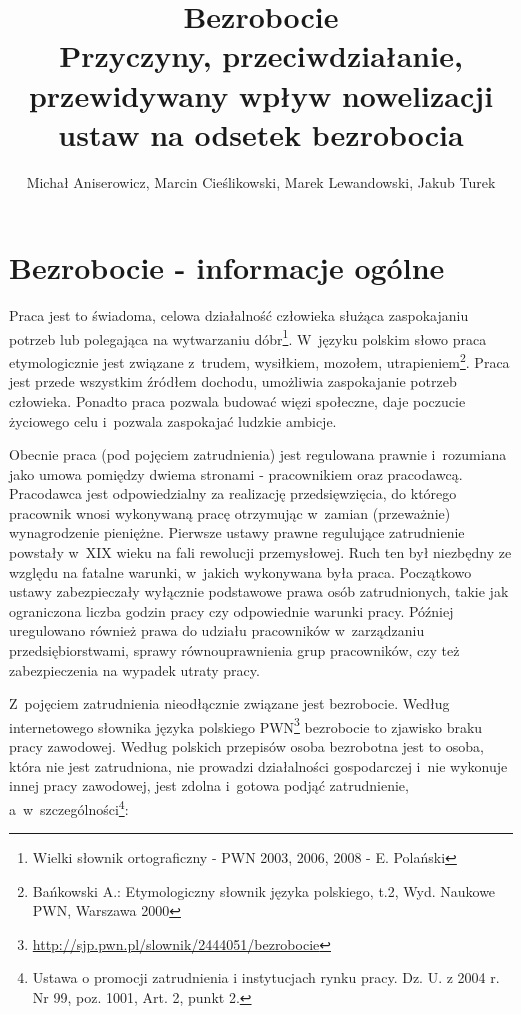 \documentclass[12pt]{article}
\title{Bezrobocie \\ \Large{Przyczyny, przeciwdziałanie, przewidywany wpływ nowelizacji ustaw na odsetek bezrobocia}}
\author{Michał Aniserowicz, Marcin Cieślikowski, Marek Lewandowski, Jakub Turek}
\date{}
\begin{document}
    \maketitle
    
    \section*{Bezrobocie - informacje ogólne}
    
    Praca jest to świadoma, celowa działalność człowieka służąca zaspokajaniu potrzeb lub polegająca na wytwarzaniu dóbr\footnote{Wielki słownik ortograficzny - PWN 2003, 2006, 2008 - E. Polański}. W~języku polskim słowo praca etymologicznie jest związane z~trudem, wysiłkiem, mozołem, utrapieniem\footnote{Bańkowski A.: Etymologiczny słownik języka polskiego, t.2, Wyd. Naukowe PWN, Warszawa 2000}. Praca jest przede wszystkim źródłem dochodu, umożliwia zaspokajanie potrzeb człowieka. Ponadto praca pozwala budować więzi społeczne, daje poczucie życiowego celu i~pozwala zaspokajać ludzkie ambicje. 
    
    Obecnie praca (pod pojęciem zatrudnienia) jest regulowana prawnie i~rozumiana jako umowa pomiędzy dwiema stronami - pracownikiem oraz pracodawcą. Pracodawca jest odpowiedzialny za realizację przedsięwzięcia, do którego pracownik wnosi wykonywaną pracę otrzymując w~zamian (przeważnie) wynagrodzenie pieniężne. Pierwsze ustawy prawne regulujące zatrudnienie powstały w~XIX wieku na fali rewolucji przemysłowej. Ruch ten był niezbędny ze względu na fatalne warunki, w~jakich wykonywana była praca. Początkowo ustawy zabezpieczały wyłącznie podstawowe prawa osób zatrudnionych, takie jak ograniczona liczba godzin pracy czy odpowiednie warunki pracy. Później uregulowano również prawa do udziału pracowników w~zarządzaniu przedsiębiorstwami, sprawy równouprawnienia grup pracowników, czy też zabezpieczenia na wypadek utraty pracy.
    
    Z~pojęciem zatrudnienia nieodłącznie związane jest bezrobocie. Według internetowego słownika języka polskiego PWN\footnote{\url{http://sjp.pwn.pl/slownik/2444051/bezrobocie}} bezrobocie to zjawisko braku pracy zawodowej. Według polskich przepisów osoba bezrobotna jest to osoba, która nie jest zatrudniona, nie prowadzi działalności gospodarczej i~nie wykonuje innej pracy zawodowej, jest zdolna i~gotowa podjąć zatrudnienie, a~w~szczególności\footnote{Ustawa o promocji zatrudnienia i instytucjach rynku pracy. Dz. U. z 2004 r. Nr 99, poz. 1001, Art. 2, punkt 2.}:
    
\end{document}
